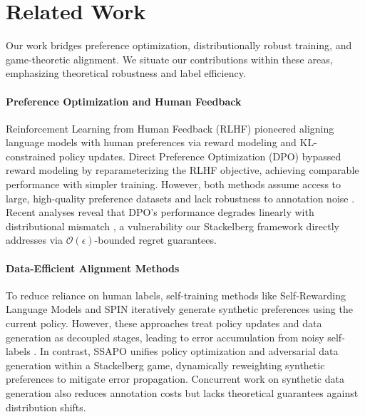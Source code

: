 \section{Related Work}
\label{sec:related_work }

Our work bridges preference optimization, distributionally robust training, and game-theoretic alignment. We situate our contributions within these areas, emphasizing theoretical robustness and label efficiency.

\paragraph{Preference Optimization and Human Feedback}
Reinforcement Learning from Human Feedback (RLHF) \citep{Christiano2017DeepRLHF} pioneered aligning language models with human preferences via reward modeling and KL-constrained policy updates. Direct Preference Optimization (DPO) \citep{Rafailov2023DirectPreference} bypassed reward modeling by reparameterizing the RLHF objective, achieving comparable performance with simpler training. However, both methods assume access to large, high-quality preference datasets and lack robustness to annotation noise \citep{Zhang2023DPOPitfalls}. Recent analyses reveal that DPO’s performance degrades linearly with distributional mismatch \citep{Liu2023StatisticalUG}, a vulnerability our Stackelberg framework directly addresses via $\mathcal{O}(\epsilon)$-bounded regret guarantees.

\paragraph{Data-Efficient Alignment Methods}
To reduce reliance on human labels, self-training methods like Self-Rewarding Language Models \citep{Yuan2024Self-RewardingLM} and SPIN \citep{Chen2024SelfPlay} iteratively generate synthetic preferences using the current policy. However, these approaches treat policy updates and data generation as decoupled stages, leading to error accumulation from noisy self-labels \citep{Pal2024BeyondSynthetic}. In contrast, SSAPO unifies policy optimization and adversarial data generation within a Stackelberg game, dynamically reweighting synthetic preferences to mitigate error propagation. Concurrent work on synthetic data generation \citep{Guo2024SyntheticDP} also reduces annotation costs but lacks theoretical guarantees against distribution shifts.

